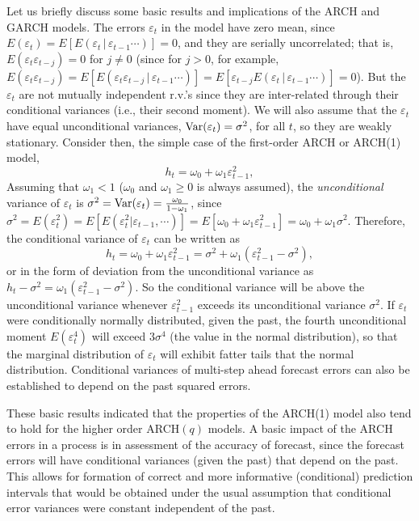 Let us briefly discuss some basic results and implications of the ARCH and GARCH models. The errors $\varepsilon_t$ in the model have zero mean, since $E(\varepsilon_t) = E[E(\varepsilon_t\,|\,\varepsilon_{t-1}\cdots)] = 0$, and they are serially uncorrelated; that is, $E(\varepsilon_t\varepsilon_{t-j}) = 0$ for $j \not= 0$ (since for $j > 0$, for example, $E(\varepsilon_t\varepsilon_{t-j}) = E[E(\varepsilon_t\varepsilon_{t-j}\,|\,\varepsilon_{t-1}\cdots)] = E[\varepsilon_{t-j}E(\varepsilon_t\,|\,\varepsilon_{t-1}\cdots)] = 0$). But the $\varepsilon_t$ are not mutually independent r.v.'s since they are inter-related through their conditional variances (i.e., their second moment). We will also assume that the $\varepsilon_t$ have equal unconditional variances, $\operatorname{Var}(\varepsilon_t) = \sigma^2$, for all $t$, so they are weakly stationary. Consider then, the simple case of the first-order ARCH or ARCH(1) model,
	\begin{equation}\label{eqn:2htE}
	h_t = \omega_0 + \omega_1\varepsilon_{t-1}^2,
	\end{equation}
Assuming that $\omega_1 < 1$ ($\omega_0$ and $\omega_1 \geq 0$ is always assumed), the \textit{unconditional} variance of $\varepsilon_t$ is $\sigma^2= \operatorname{Var}(\varepsilon_t) = \frac{\omega_0}{1 - \omega_1}$, since $\sigma^2 = E(\varepsilon_t^2) = E[E(\varepsilon_t^2|\varepsilon_{t-1},\cdots)] = E[\omega_0 + \omega_1\varepsilon_{t-1}^2] = \omega_0 + \omega_1\sigma^2$. Therefore, the conditional variance of $\varepsilon_t$ can be written as
	\begin{equation}\label{eqn:2htw}
	h_t = \omega_0 + \omega_1\varepsilon_{t-1}^2 = \sigma^2 + \omega_1(\varepsilon_{t-1}^2 - \sigma^2),
	\end{equation}
or in the form of deviation from the unconditional variance as $h_t - \sigma^2= \omega_1(\varepsilon_{t-1}^2 - \sigma^2)$. So the conditional variance will be above the unconditional variance whenever $\varepsilon_{t-1}^2$ exceeds its unconditional variance $\sigma^2$. If $\varepsilon_t$ were conditionally normally distributed, given the past, the fourth unconditional moment $E(\varepsilon_t^4)$ will exceed $3\sigma^4$ (the value in the normal distribution), so that the marginal distribution of $\varepsilon_t$ will exhibit fatter tails that the normal distribution. Conditional variances of multi-step ahead forecast errors can also be established to depend on the past squared errors. 


These basic results indicated that the properties of the ARCH(1) model also tend to hold for the higher order ARCH$(q)$ models. A basic impact of the ARCH errors in a process is in assessment of the accuracy of forecast, since the forecast errors will have conditional variances (given the past) that depend on the past. This allows for formation of correct and more informative (conditional) prediction intervals that would be obtained under the usual assumption that conditional error variances were constant independent of the past.


